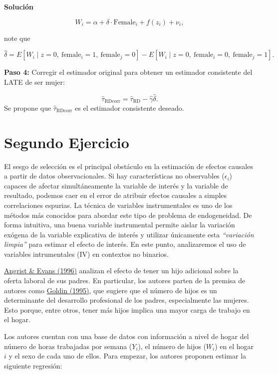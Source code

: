 \documentclass[a4paper, answers, addpoints, 11pt]{exam}
\newenvironment{solucion}{%
  \begin{mdframed}[
    backgroundcolor=blue!5,    %
    linecolor=blue!50,          %
    linewidth=2pt,              %
    leftmargin=10pt,            %
    rightmargin=8pt,           %
    topline=true,              %
    bottomline=true,            %
    roundcorner=10pt,           %
    innerleftmargin=10pt,       %
    innerrightmargin=10pt,      %
    innerbottommargin=10pt,     %
    innertopmargin=10pt         %
  ]%
  \begin{tcolorbox}[colframe=blue!50!black, colback=blue!50, coltitle=white, sharp corners=all, boxrule=1mm, width=\textwidth, halign=left, valign=center, top=0mm, bottom=0mm, left=0mm, right=0mm] \textbf{Solución} \end{tcolorbox} }{\end{mdframed}}
\begin{document}
\begin{enumerate}[resume]
\begin{solucion}
\[
W_i = \alpha + \delta \cdot \text{Female}_i + f(z_i) + \nu_i,
\]

note que 

\[
\hat{\delta} = E[W_i \mid z = 0,\ \text{female}_i = 1,\ \text{female}_j = 0] - E[W_i \mid z = 0,\ \text{female}_i = 0,\ \text{female}_j = 1].
\]

\vspace{0.3cm}
\textbf{Paso 4:} Corregir el estimador original para obtener un estimador consistente del LATE de ser mujer:

\[
\hat{\tau}_{\text{RDcorr}} = \hat{\tau}_{\text{RD}} - \hat{\gamma} \hat{\delta}. \tag{9}
\]
Se propone que $\hat{\tau}_{\text{RDcorr}}$ es el estimador consistente deseado.



\end{solucion}
\end{enumerate}
\newpage
\section*{Segundo Ejercicio}
El sesgo de selección es el principal obstáculo en la estimación de efectos causales a partir de datos observacionales. Si hay características no observables ($\epsilon_i$) capaces de afectar simultáneamente la variable de interés y la variable de resultado, podemos caer en el error de atribuir efectos causales a simples correlaciones espurias. La técnica de variables instrumentales es uno de los métodos más conocidos para abordar este tipo de problema de endogeneidad. De forma intuitiva, una buena variable instrumental permite aislar la variación exógena de la variable explicativa de interés y utilizar únicamente esta \textit{``variación limpia''} para estimar el efecto de interés. En este punto, analizaremos el uso de variables intrumentales (IV) en contextos no binarios.

\bigbreak
\href{https://www.nber.org/system/files/working_papers/w5778/w5778.pdf}{Angrist \& Evans (1996)} analizan el efecto de tener un hijo adicional sobre la oferta laboral de sus padres. En particular, los autores parten de la premisa de autores como \href{https://www.nber.org/system/files/working_papers/w5188/w5188.pdf}{Goldin (1995)}, que sugiere que el número de hijos es un determinante del desarrollo profesional de los padres, especialmente las mujeres. Esto porque, entre otros, tener más hijos implica una mayor carga de trabajo en el hogar. 

\bigbreak
Los autores cuentan con una base de datos con información a nivel de hogar del número de horas trabajadas por semana ($Y_i$), el número de hijos ($W_i$) en el hogar $i$ y el sexo de cada uno de ellos. Para empezar, los autores proponen estimar la siguiente regresión:
\end{document}
